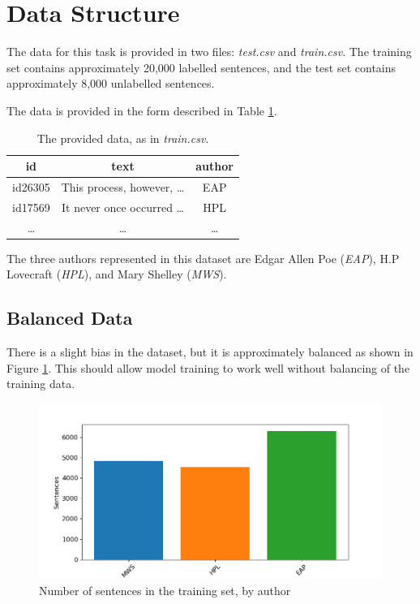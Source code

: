 \section{Data Structure}
\label{sec:data_structure}
The data for this task is provided in two files: \textit{test.csv} and \textit{train.csv}. The training set contains approximately 20,000 labelled sentences, and the test set contains approximately 8,000 unlabelled sentences.

The data is provided in the form described in Table \ref{tab:data_form}.

\begin{table}[h]
\centering
\begin{tabular}{|c|c|c|}
\hline 
\textbf{id} & \textbf{text} & \textbf{author} \\ 
\hline 
id26305 & This process, however, \ldots & EAP \\ 
\hline 
id17569 & It never once occurred \ldots & HPL \\ 
\hline 
\ldots & \ldots & \ldots \\ 
\hline 
\end{tabular} 
\caption{The provided data, as in \textit{train.csv}.}
\label{tab:data_form}
\end{table}
The three authors represented in this dataset are Edgar Allen Poe (\textit{EAP}), H.P Lovecraft (\textit{HPL}), and Mary Shelley (\textit{MWS}).

\subsection{Balanced Data}
\label{sec:balanced_data}

There is a slight bias in the dataset, but it is approximately balanced as shown in Figure \ref{fig:balance}. This should allow model training to work well without balancing of the training data.

\begin{figure}[h]
\centering
\includegraphics[width=\columnwidth]{Figures/Data_Structure/balance.png}
\caption{Number of sentences in the training set, by author}
\label{fig:balance}
\end{figure}

